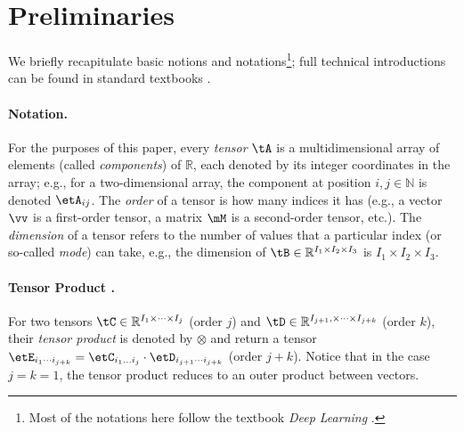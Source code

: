 \section{Preliminaries}
\label{sec:preliminaries}
We briefly recapitulate basic notions and notations\footnote{Most of the notations here  follow the textbook \textit{Deep Learning}
\cite{goodfellow2016deep}.}; full technical introductions can be found in standard textbooks \cite{BI20221, 10.5555/1643460}.


\paragraph{Notation.} For the purposes of this paper, every \textit{tensor} $\tA$  is a multidimensional array of elements (called \emph{components}) of $\mathbb{R}$, each denoted by its integer coordinates in the array; e.g., for a two-dimensional array, the component at position $i,j \in \mathbb{N}$ is denoted $\etA_{ij}$.
 The \emph{order} of a tensor is how many indices it has (e.g., a vector $\vv$ is a first-order tensor, a matrix $\mM$ is a second-order tensor, etc.). The \emph{dimension} of a tensor refers to the number of values that a particular index (or so-called \textit{mode}) can take, e.g., the dimension of $\tB \in \mathbb{R}^{I_1 \times I_2 \times I_3}$ is $I_1 \times I_2 \times I_3$. 

\paragraph{Tensor Product \cite{cohen2016expressive}.} For two tensors $\tC \in \mathbb{R}^{I_1 \times \cdots \times I_j}$ (order $j$) and $\tD \in \mathbb{R}^{I_{j+1}, \times \cdots \times I_{j+k}}$ (order $k$), their \textit{tensor product} is denoted by $\otimes$ and return a tensor $\etE_{i_1 \cdots i_{j+k}} = \etC_{i_1...i_j} \cdot \etD_{i_{j+1} \cdots i_{j+k}}$ (order $j+k$).  Notice that in the case $j = k = 1$, the tensor product reduces to an outer product between vectors.


